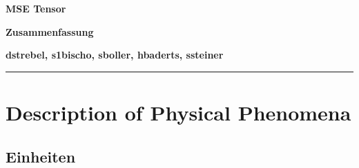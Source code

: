 \documentclass[a4paper, 10pt]{scrartcl}
\begin{document}
	\pagestyle{fancy}
	\fancyhf{} 
	\fancyfoot[C]{\thepage} %
	\renewcommand{\headrulewidth}{0pt}
	\renewcommand{\footrulewidth}{0.5pt}
	\newcommand{\laplace}{\Delta}
	\centerline{\LARGE \bf \textsf{MSE Tensor}} 
	\smallskip
	\centerline{\Large \bf \textsf {Zusammenfassung}}
	\medskip
	\centerline{\bf \textsf{dstrebel, s1bischo, sboller, hbaderts, ssteiner }}
	
	\smallskip \noindent\rule{\textwidth}{0.5pt}
	\smallskip%
	
	\setcounter{tocdepth}{2}
	
	
	
	
	
	\tableofcontents
	
	\newpage
	
	\section{Description of Physical Phenomena}
	\subsection{Einheiten}
	
\end{document}
